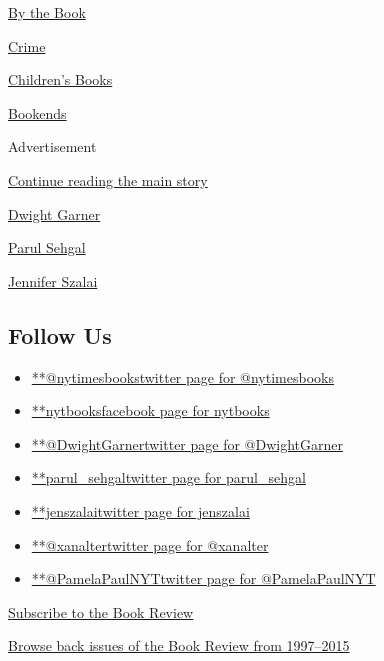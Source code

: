 \href{https://www.nytimes.com/column/by-the-book}{By the Book}

\href{https://www.nytimes.com/column/crime}{Crime}

\href{https://www.nytimes.com/column/childrens-books}{Children's Books}

\href{https://www.nytimes.com/column/bookends}{Bookends}

Advertisement

\protect\hyperlink{after-mktg}{Continue reading the main story}

\href{https://www.nytimes.com/by/dwight-garner}{Dwight Garner}

\href{https://www.nytimes.com/by/parul-sehgal}{Parul Sehgal}

\href{https://www.nytimes.com/by/jennifer-szalai}{Jennifer Szalai}

\hypertarget{follow-us}{%
\subsection{Follow Us}\label{follow-us}}

\begin{itemize}
\tightlist
\item
  \href{https://twitter.com/nytimesbooks}{**@nytimesbookstwitter page
  for @nytimesbooks}
\item
  \href{https://www.facebook.com/nytbooks}{**nytbooksfacebook page for
  nytbooks}
\item
  \href{https://twitter.com/DwightGarner}{**@DwightGarnertwitter page
  for @DwightGarner}
\item
  \href{https://twitter.com/parul_sehgal}{**parul\_sehgaltwitter page
  for parul\_sehgal}
\item
  \href{https://twitter.com/jenszalai}{**jenszalaitwitter page for
  jenszalai}
\item
  \href{https://twitter.com/xanalter}{**@xanaltertwitter page for
  @xanalter}
\item
  \href{https://twitter.com/PamelaPaulNYT}{**@PamelaPaulNYTtwitter page
  for @PamelaPaulNYT}
\end{itemize}

\href{https://homedelivery.nytimes.com/HDS/BookReviewHome.do?mode=BookReviewHome\&ref=review}{Subscribe
to the Book Review}

\href{https://www.nytimes.com/2014/07/29/books/review/the-new-york-times-book-review-back-issues.html}{Browse
back issues of the Book Review from 1997--2015}

